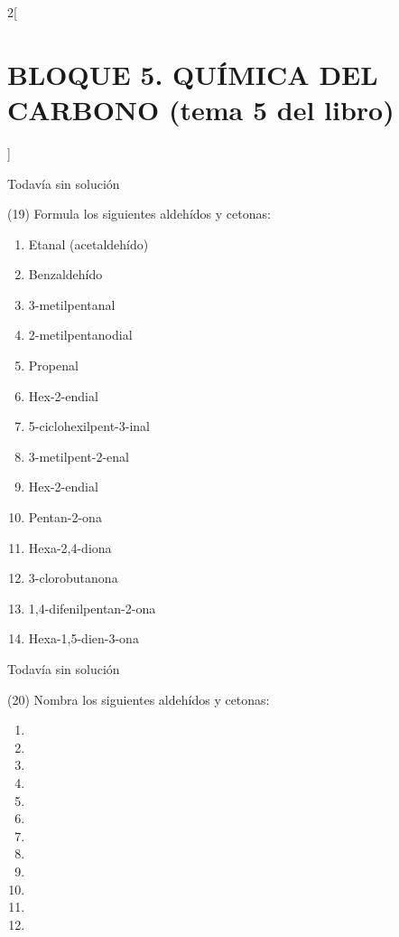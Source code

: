 \documentclass[10pt]{article}
\begin{document}
\begin{multicols}{2}[
  \section{BLOQUE 5. QUÍMICA DEL CARBONO (tema 5 del libro)}
  ]
\begin{solution}[print=false]
  Todavía sin solución
\end{solution}




\begin{exercise}[
    tags    = {},
    topics  = {química, química orgánica, orgánica},
    source  = {FQ 1B MGH 2016, p136, e19},
  ]
  (19) Formula los siguientes aldehídos y cetonas:
  \begin{enumerate}
    \item Etanal (acetaldehído)
    \item Benzaldehído
    \item 3-metilpentanal
    \item 2-metilpentanodial
    \item Propenal
    \item Hex-2-endial
    \item 5-ciclohexilpent-3-inal
    \item 3-metilpent-2-enal
    \item Hex-2-endial
    \item Pentan-2-ona
    \item Hexa-2,4-diona
    \item 3-clorobutanona
    \item 1,4-difenilpentan-2-ona
    \item Hexa-1,5-dien-3-ona
  \end{enumerate}
\end{exercise}

\begin{solution}[print=false]
  Todavía sin solución
\end{solution}




\begin{exercise}[
    tags    = {},
    topics  = {química, química orgánica, orgánica},
    source  = {FQ 1B MGH 2016, p136, e20},
  ]
  (20) Nombra los siguientes aldehídos y cetonas:

  \begin{enumerate}
    \item {}
    \item {}
    \item {}
    \item {}
    \item {}
    \item {}
    \item {}
    \item {}
    \item {}
    \item {}
    \item {}
    \item {}
  \end{enumerate}
\end{exercise}


\end{multicols}
\end{document}
